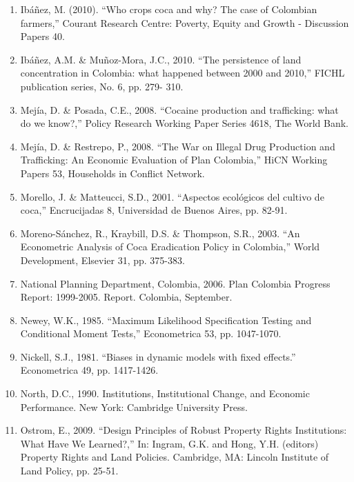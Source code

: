\documentclass[12pt,a4paper,english]{article}%
\begin{document}
\begin{enumerate}
\item Ib\'{a}\~{n}ez, M. (2010). ``Who crops coca and why? The case of Colombian farmers,'' Courant Research Centre: Poverty, Equity and Growth - Discussion Papers 40.

\item Ib\'{a}\~{n}ez, A.M. \& Mu\~{n}oz-Mora, J.C., 2010. ``The persistence of land concentration in Colombia: what happened between 2000 and 2010,'' FICHL publication series, No. 6, pp. 279- 310.

\item Mej\'{i}a, D. \& Posada, C.E., 2008. ``Cocaine production and trafficking: what do we know?,'' Policy Research Working Paper Series 4618, The World Bank.

\item Mej\'{i}a, D. \& Restrepo, P., 2008. ``The War on Illegal Drug Production and Trafficking: An Economic Evaluation of Plan Colombia,'' HiCN Working Papers 53, Households in Conflict Network.

\item Morello, J. \& Matteucci, S.D., 2001. ``Aspectos ecológicos del cultivo de coca,'' Encrucijadas 8, Universidad de Buenos Aires, pp. 82-91.

\item Moreno-S\'{a}nchez, R., Kraybill, D.S. \& Thompson, S.R., 2003. ``An Econometric Analysis of Coca Eradication Policy in Colombia,'' World Development, Elsevier 31, pp. 375-383.

\item National Planning Department, Colombia, 2006. Plan Colombia Progress Report: 1999-2005. Report. Colombia, September.

\item Newey, W.K., 1985. ``Maximum Likelihood Specification Testing and Conditional Moment Tests,'' Econometrica 53, pp. 1047-1070.

\item Nickell, S.J., 1981. ``Biases in dynamic models with fixed effects.'' Econometrica 49, pp. 1417-1426.

\item North, D.C., 1990. Institutions, Institutional Change, and Economic Performance. New York: Cambridge University Press.

\item Ostrom, E., 2009. ``Design Principles of Robust Property Rights Institutions: What Have We Learned?,'' In: Ingram, G.K. and Hong, Y.H. (editors) Property Rights and Land Policies. Cambridge, MA: Lincoln Institute of Land Policy, pp. 25-51.


\end{enumerate}
\end{document}
